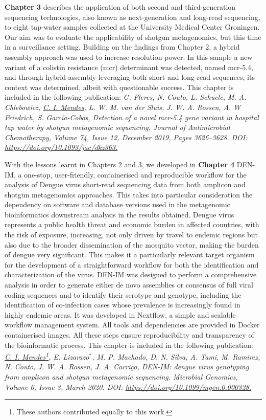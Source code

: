 \textbf{Chapter 3} describes the application of both second and third-generation sequencing technologies, also known as next-generation and long-read sequencing, to eight tap-water samples collected at the University Medical Center Groningen. Our aim was to evaluate the applicability of shotgun metagenomics, but this time in a surveillance setting. Building on the findings from Chapter 2, a hybrid assembly approach was used to increase resolution power. In this sample a new variant of a colistin resistance (mcr) determinant was detected, named mcr-5.4, and through hybrid assembly leveraging both short and long-read sequences, its context was determined, albeit with questionable success. This chapter is included in the following publication: \textit{G. Fleres, N. Couto, L. Schuele, M. A. Chlebowicz, \underline{C. I. Mendes}, L. W. M. van der Sluis, J. W. A. Rossen, A. W Friedrich, S. García-Cobos, Detection of a novel mcr-5.4 gene variant in hospital tap water by shotgun metagenomic sequencing, Journal of Antimicrobial Chemotherapy, Volume 74, Issue 12, December 2019, Pages 3626–3628.  DOI: \url{https://doi.org/10.1093/jac/dkz363.}}

With the lessons learnt in Chapters 2 and 3, we developed in \textbf{Chapter 4} DEN-IM, a one-stop, user-friendly, containerised and reproducible workflow for the analysis of Dengue virus short-read sequencing data from both amplicon and shotgun metagenomics approaches. This takes into particular consideration the dependency on software and database versions used in the metagenomic bioinformatics downstream analysis in the results obtained. Dengue virus represents a public health threat and economic burden in affected countries, with the risk of exposure, increasing, not only driven by travel to endemic regions but also due to the broader dissemination of the mosquito vector, making the burden of dengue very significant. This makes it a particularly relevant target organism for the development of a straightforward workflow for both the identification and characterization of the virus. DEN-IM was designed to perform a comprehensive analysis in order to generate either de novo assemblies or consensus of full viral coding sequences and to identify their serotype and genotype, including the identification of co-infection cases whose prevalence is increasingly found in highly endemic areas. It was developed in Nextflow,  a simple and scalable workflow management system. All tools and dependencies are provided in Docker containerised images. All these steps ensure reproducibility and transparency of the bioinformatic process. This chapter is included in the following publication: \textit{\underline{C. I. Mendes}\footnote[1]{These authors contributed equally to this work.}, E. Lizarazo$^*$, M. P. Machado, D. N. Silva, A. Tami, M. Ramirez, N. Couto, J. W. A. Rossen, J. A. Carriço, DEN-IM: dengue virus genotyping from amplicon and shotgun metagenomic sequencing. Microbial Genomics, Volume 6, Issue 3, March 2020. DOI: \url{https://doi.org/10.1099/mgen.0.000328.}}

